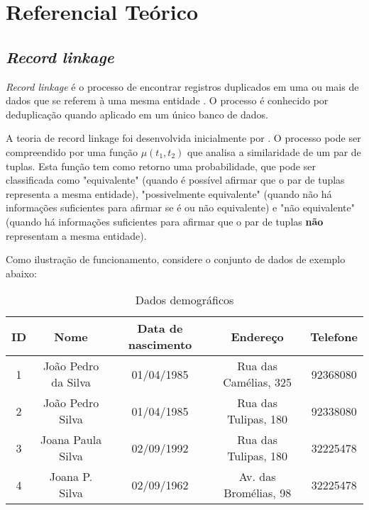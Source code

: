 \documentclass[
	12pt,				%
	openany,			%
	twoside,			%
	a4paper,			%
	brazil,				%
	]{unimontes-ppgmsc-abntex2}
\begin{document}
\chapter{Referencial Teórico}
\section{\textit{Record linkage}}
\textit{Record linkage} é o processo de encontrar registros duplicados em uma ou mais de dados que se referem à uma mesma entidade \cite{survey}. O processo é conhecido por deduplicação quando aplicado em um único banco de dados.

A teoria de record linkage foi desenvolvida inicialmente por \cite{fellegi}. O processo pode ser compreendido por uma função $\mu(t_1,t_2)$ que analisa a similaridade de um par de tuplas. Esta função tem como retorno uma probabilidade, que pode ser classificada como "equivalente" (quando é possível afirmar que o par de tuplas representa a mesma entidade), "possivelmente equivalente" (quando não há informações suficientes para afirmar se é ou não equivalente) e "não equivalente" (quando há informações suficientes para afirmar que o par de tuplas \textbf{não} representam a mesma entidade).

Como ilustração de funcionamento, considere o conjunto de dados de exemplo abaixo:

\begin{table}[!htpb]
    \centering
    \caption{Dados demográficos}
    \label{dataset}
    \begin{tabular}{|c|c|c|c|c|}
        \hline
        \textbf{ID} & \textbf{Nome} & \textbf{Data de nascimento} & \textbf{Endereço} & \textbf{Telefone} \\ \hline
        1 & João Pedro da Silva            & 01/04/1985                                   & Rua das Camélias, 325              & 92368080                           \\ \hline
        2 & João Pedro Silva               & 01/04/1985                                   & Rua das Tulipas, 180               & 92338080                           \\ \hline
        3 & Joana Paula Silva              & 02/09/1992                                   & Rua das Tulipas, 180               & 32225478                           \\ \hline
        4 & Joana P. Silva                 & 02/09/1962                                   & Av. das Bromélias, 98              & 32225478                           \\ \hline
    \end{tabular}
\end{table}
\end{document}
